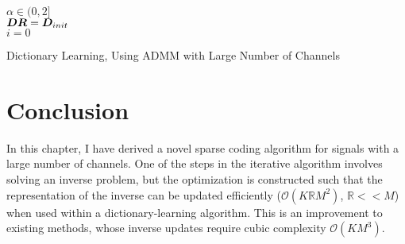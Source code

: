\begin{algorithm}[h]
\SetAlgoLined
   $\alpha \in (0,2]$ \\
   $\bm{D}\bm{R} = \bm{D}_{init}$ \\
   $i = 0$
 \caption{Dictionary Learning, Using ADMM with Large Number of Channels}
\end{algorithm}


\section{Conclusion}
In this chapter, I have derived a novel sparse coding algorithm for signals with a large number of channels. One of the steps in the iterative algorithm involves solving an inverse problem, but the optimization is constructed such that the representation of the inverse can be updated efficiently ($\mathcal{O}(K\mathbb{R}M^2)$, $\mathbb{R} << M$) when used within a dictionary-learning algorithm. This is an improvement to existing methods, whose inverse updates require cubic complexity $\mathcal{O}(KM^3)$.
